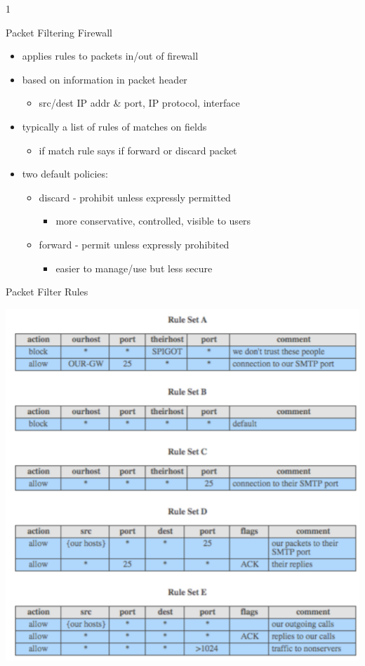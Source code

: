 1\documentclass{beamer}
\begin{document}
\begin{frame}{Packet Filtering Firewall}
  \begin{itemize}
  \item applies rules to packets in/out of firewall 
  \item based on information in packet header 
    \begin{itemize}
    \item src/dest IP addr \& port, IP protocol, interface 
    \end{itemize}
  \item typically a list of rules of matches on fields 
    \begin{itemize}
    \item if match rule says if forward or discard packet 
    \end{itemize}
  \item two default policies: 
    \begin{itemize}
    \item discard - prohibit unless expressly permitted 
      \begin{itemize}
      \item more conservative, controlled, visible to users 
      \end{itemize}
    \end{itemize}
    \begin{itemize}
    \item forward - permit unless expressly prohibited 
      \begin{itemize}
      \item easier to manage/use but less secure 
      \end{itemize}
    \end{itemize}
  \end{itemize}
\end{frame}

\begin{frame}{Packet Filter Rules}
  \begin{center}
    \includegraphics[width=0.6\linewidth]{filter-rules}
  \end{center}
\end{frame}
\end{document}
